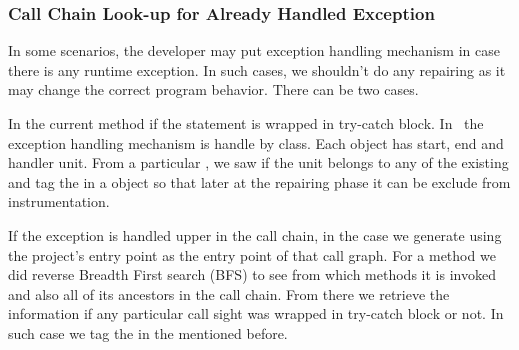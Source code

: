 \subsubsection{Call Chain Look-up for Already Handled Exception}
\label{subsubsec:callChainLookUp}

In some scenarios, the developer may put exception handling mechanism in case
there is any runtime exception. In such cases, we shouldn't do any repairing
as it may change the correct program behavior. There can be two cases.

\begin{mylist}

\item In the current method if the statement is wrapped in try-catch block. In
\soot\
the exception handling mechanism is handle by  class. Each
object has start, end and handler unit. From a particular , we saw if
the unit belongs to any of the existing \code{Trap} and tag the \code{Unit} in
a \code{HashMap} object so that later at the repairing phase it can be exclude
from instrumentation.

\item If the exception is handled upper in the call chain, in the case we
generate
 using the project's entry point as the entry point of that call
graph. For a method we did reverse Breadth First search (BFS) to see from which
methods it is invoked and also all of its ancestors in the call chain. From
there
we retrieve the information if any particular call sight was wrapped in
try-catch
block or not. In such case we tag the  in the 
mentioned
before.

\end{mylist}

